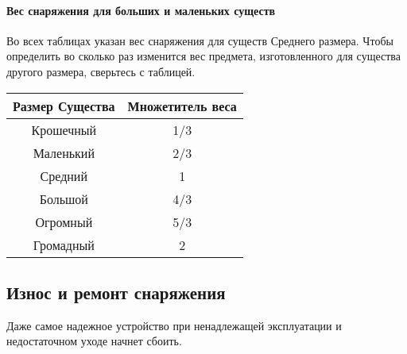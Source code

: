 \paragraph{Вес снаряжения для больших и маленьких существ}
Во всех таблицах указан вес снаряжения для существ Среднего размера. Чтобы определить во сколько раз изменится вес предмета, изготовленного для существа другого размера, сверьтесь с таблицей.
\begin{center}
\begin{tabular}{|c|c|}
\hline
Размер Существа & Множетитель веса \\ \hline
Крошечный & 1/3 \\ \hline
Маленький & 2/3 \\ \hline
Средний & 1 \\ \hline
Большой & 4/3 \\ \hline
Огромный & 5/3 \\ \hline
Громадный & 2 \\ \hline
\end{tabular}
\end{center}

\subsection{Износ и ремонт снаряжения}
Даже самое надежное устройство при ненадлежащей эксплуатации и недостаточном уходе начнет сбоить.
